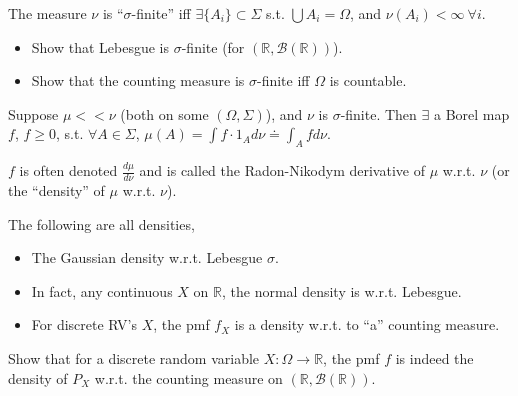 \documentclass[twoside]{article}
\begin{document}
\begin{definition}
  The measure $\nu$ is ``$\sigma$-finite'' iff $\exists \{A_i\} \subset \Sigma$ s.t. $\bigcup A_i = \Omega$, and $\nu(A_i) < \infty \ \forall i$.
\end{definition}

\begin{exercise}
  \leavevmode
  \begin{itemize}
    \item Show that Lebesgue is $\sigma$-finite (for $(\mathbb{R}, \mathcal{B}(\mathbb{R}))$).
    \item Show that the counting measure is $\sigma$-finite iff $\Omega$ is countable.
  \end{itemize}
\end{exercise}

\begin{theorem}
  Suppose $\mu << \nu$ (both on some $(\Omega, \Sigma)$), and $\nu$ is $\sigma$-finite. Then $\exists$ a Borel map $f$, $f \geq 0$, s.t. $\forall A \in \Sigma$, $\mu(A) = \int f \cdot 1_A d\nu \doteq \int_A f d\nu$.

  $f$ is often denoted $\frac{d\mu}{d\nu}$ and is called the Radon-Nikodym derivative of $\mu$ w.r.t. $\nu$ (or the ``density'' of $\mu$ w.r.t. $\nu$).
\end{theorem}

\begin{example} The following are all densities,
  \begin{itemize}
    \item The Gaussian density w.r.t. Lebesgue $\sigma$.
    \item In fact, any continuous $X$ on $\mathbb{R}$, the normal density is w.r.t. Lebesgue.
    \item For discrete RV's $X$, the pmf $f_X$ is a density w.r.t. to ``a'' counting measure.
  \end{itemize}
\end{example}

\begin{exercise}
  Show that for a discrete random variable $X: \Omega \rightarrow \mathbb{R}$, the pmf $f$ is indeed the density of $P_X$ w.r.t. the counting measure on $(\mathbb{R}, \mathcal{B}(\mathbb{R}))$.
\end{exercise}
\end{document}
